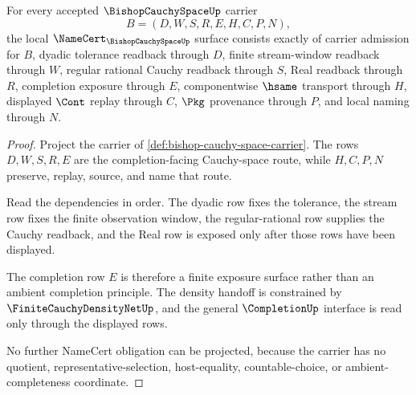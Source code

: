 \begin{theorem}
\label{thm:bishop-cauchy-space-namecert-obligations}
For every accepted $\BishopCauchySpaceUp$ carrier
$$
B=(D,W,S,R,E,H,C,P,N),
$$
the local $\NameCert_{\BishopCauchySpaceUp}$ surface consists exactly of carrier admission for $B$, dyadic tolerance readback through $D$, finite stream-window readback through $W$, regular rational Cauchy readback through $S$, Real readback through $R$, completion exposure through $E$, componentwise $\hsame$ transport through $H$, displayed $\Cont$ replay through $C$, $\Pkg$ provenance through $P$, and local naming through $N$.
\end{theorem}
\begin{proof}
Project the carrier of \autoref{def:bishop-cauchy-space-carrier}. The rows $D,W,S,R,E$ are the completion-facing Cauchy-space route, while $H,C,P,N$ preserve, replay, source, and name that route.

Read the dependencies in order. The dyadic row fixes the tolerance, the stream row fixes the finite observation window, the regular-rational row supplies the Cauchy readback, and the Real row is exposed only after those rows have been displayed.

The completion row $E$ is therefore a finite exposure surface rather than an ambient completion principle. The density handoff is constrained by $\FiniteCauchyDensityNetUp$, and the general $\CompletionUp$ interface is read only through the displayed rows.

No further NameCert obligation can be projected, because the carrier has no quotient, representative-selection, host-equality, countable-choice, or ambient-completeness coordinate.
\end{proof}

